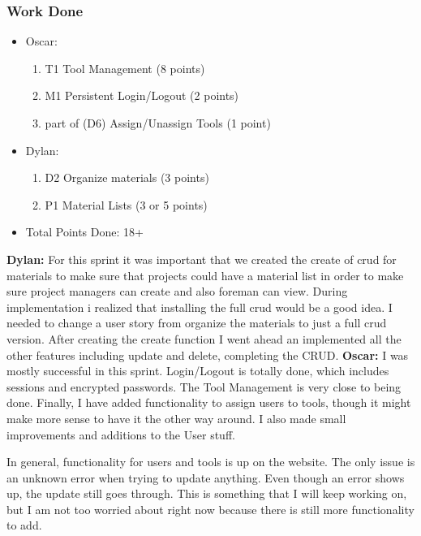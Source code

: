 \documentclass{article}
\begin{document}
\subsubsection{Work Done}

\begin{itemize}
    \item Oscar:
        \begin{enumerate}
            \item T1 Tool Management (8 points)
            \item M1 Persistent Login/Logout (2 points)
            \item part of (D6) Assign/Unassign Tools (1 point)
        \end{enumerate}

    \item Dylan:
        \begin{enumerate}
            \item D2 Organize materials (3 points)
            \item P1 Material Lists (3 or 5 points)
                
        \end{enumerate}

    \item Total Points Done: 18+
\end{itemize}

\textbf{Dylan:} For this sprint it was important that we created the create of crud for materials to make sure that projects could have a material list in order to make sure project managers can create and also foreman can view. During implementation i realized that installing the full crud would be a good idea. I needed to change a user story from organize the materials to just a full crud version. After creating the create function I went ahead an implemented all the other features including update and delete, completing the CRUD.
\textbf{Oscar:} I was mostly successful in this sprint. Login/Logout is totally done, which includes sessions and encrypted passwords. The Tool Management is very close to being done. Finally, I have added functionality to assign users to tools, though it might make more sense to have it the other way around. I also made small improvements and additions to the User stuff. 

In general, functionality for users and tools is up on the website. The only issue is an unknown error when trying to update anything. Even though an error shows up, the update still goes through. This is something that I will keep working on, but I am not too worried about right now because there is still more functionality to add. 
\end{document}
